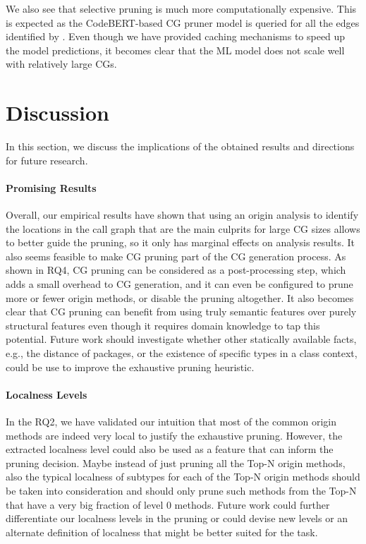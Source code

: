 We also see that selective pruning is much more computationally expensive.
This is expected as the CodeBERT-based CG pruner model is queried for all the edges identified by .
Even though we have provided caching mechanisms to speed up the model predictions, it becomes clear that the ML model does not scale well with relatively large CGs.

\section{Discussion}
In this section, we discuss the implications of the obtained results and directions for future research.

\paragraph{Promising Results}
Overall, our empirical results have shown that using an origin analysis to identify the locations in the call graph that are the main culprits for large CG sizes allows to better guide the pruning, so it only has marginal effects on analysis results.
It also seems feasible to make CG pruning part of the CG generation process. As shown in RQ4, CG pruning can be considered as a post-processing step, which adds a small overhead to CG generation, and it can even be configured to prune more or fewer origin methods, or disable the pruning altogether.
It also becomes clear that CG pruning can benefit from using truly semantic features over purely structural features even though it requires domain knowledge to tap this potential.
Future work should investigate whether other statically available facts, e.g., the distance of packages, or the existence of specific types in a class context, could be use to improve the exhaustive pruning heuristic.

\paragraph{Localness Levels}
In the RQ2, we have validated our intuition that most of the common origin methods are indeed very local to justify the exhaustive pruning.
However, the extracted localness level could also be used as a feature that can inform the pruning decision.
Maybe instead of just pruning all the Top-N origin methods, also the typical localness of subtypes for each of the Top-N origin methods should be taken into consideration and  should only prune such methods from the Top-N that have a very big fraction of level 0 methods.
Future work could further differentiate our localness levels in the pruning or could devise new levels or an alternate definition of localness that might be better suited for the task.

